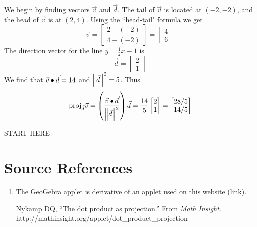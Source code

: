 \documentclass{ximera}
\begin{document}
\begin{exploration}
\begin{example}
      
      We begin by finding vectors $\vec{v}$ and $\vec{d}$. The tail of $\vec{v}$ is located at $(-2, -2)$, and the head of $\vec{v}$ is at $(2, 4)$.  Using the ``head-tail" formula we get
      $$\vec{v}=\begin{bmatrix}2-(-2)\\4-(-2)\end{bmatrix}=\begin{bmatrix}4\\6\end{bmatrix}$$ The direction vector for the line $y=\frac{1}{2}x-1$ is $$\vec{d}=\begin{bmatrix}2\\1\end{bmatrix}$$
      We find that $\vec{v}\bullet\vec{d}=14$ and $\left\|\vec{d}\right\|^2=5$.
      Thus $$\mbox{proj}_{\vec{d}}\vec{v}=\left(\frac{\vec{v}\bullet\vec{d}}{\left\|\vec{d}\right\|^2}\right)\vec{d}=\frac{14}{5}\begin{bmatrix}2\\1\end{bmatrix}=\begin{bmatrix}28/5\\14/5\end{bmatrix}$$
      
      \end{example}


\end{exploration}




START HERE


\section*{Source References}

\begin{enumerate}
   \item The GeoGebra applet is derivative of an applet used on \href{http://mathinsight.org/applet/dot_product_projection}{this website} (link). 
   
   Nykamp DQ, “The dot product as projection.” From \emph{Math Insight}. http://mathinsight.org/applet/dot\_product\_projection
\end{enumerate}
\end{document}

